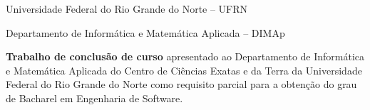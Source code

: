 
\instituicao
{
	Universidade Federal do Rio Grande do Norte -- UFRN \par 
	Departamento de Informática e Matemática Aplicada -- DIMAp
}
	
\comentario
{
	\textbf{Trabalho de conclusão de curso} apresentado ao Departamento de Informática e Matemática Aplicada do 
	Centro de Ciências Exatas e da Terra da Universidade Federal do Rio Grande do Norte como
	requisito parcial para a obtenção do grau de Bacharel em Engenharia de Software.
}
		
	
\folhaderosto